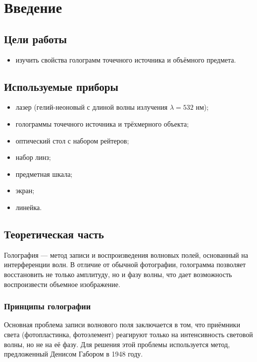 \section{Введение}
\subsection{Цели работы} 
\begin{itemize}
    \item изучить свойства голограмм точечного источника и
    объёмного предмета.
\end{itemize}

\subsection{Используемые приборы}
\begin{itemize}
    \item лазер (гелий-неоновый с длиной волны излучения $\lambda = 532$ нм);
    \item голограммы точечного источника и трёхмерного объекта;
    \item оптический стол с набором рейтеров;
    \item набор линз;
    \item предметная шкала;
    \item экран;
    \item линейка.
\end{itemize}

\subsection{Теоретическая часть}

Голография — метод записи и воспроизведения волновых полей, основанный на интерференции волн. В отличие от обычной фотографии, голограмма позволяет восстановить не только амплитуду, но и фазу волны, что дает возможность воспроизвести объемное изображение.

\subsubsection{Принципы голографии}

Основная проблема записи волнового поля заключается в том, что приёмники света (фотопластинка, фотоэлемент) реагируют только на интенсивность световой волны, но не на её фазу. Для решения этой проблемы используется метод, предложенный Денисом Габором в 1948 году.

